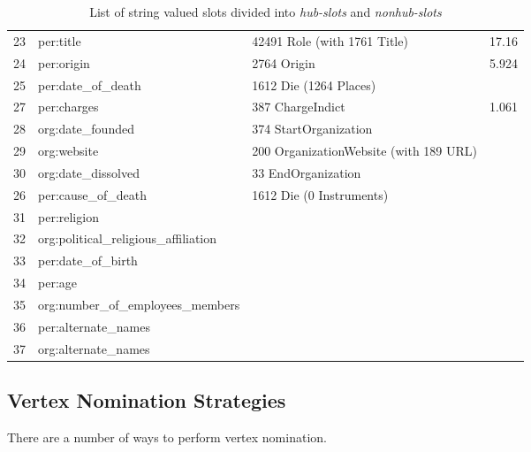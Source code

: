 \documentclass[paper=a4,fontsize=11pt]{scrartcl}
\numberwithin{equation}{section}    %
\numberwithin{figure}{section}      %
\numberwithin{table}{section}       %
\begin{document}
\begin{table}[htbp]
\centering
\begin{adjustwidth}{0}{}
\begin{tabular}{rl l l}
23 & per:title                           & 42491 Role (with 1761 Title)           & 17.16 \\
24 & per:origin                          & 2764 Origin                            & 5.924 \\
25 & per:date_of_death                   & 1612 Die (1264 Places)                         \\
27 & per:charges                         & 387 ChargeIndict                       & 1.061 \\
28 & org:date_founded                    & 374 StartOrganization                          \\
29 & org:website                         & 200 OrganizationWebsite (with 189 URL)         \\
30 & org:date_dissolved                  & 33 EndOrganization                             \\
26 & per:cause_of_death                  & 1612 Die (0 Instruments)                       \\
31 & per:religion                        &                                                \\
32 & org:political_religious_affiliation &                                                \\
33 & per:date_of_birth                   &                                                \\
34 & per:age                                                                              \\
35 & org:number_of_employees_members                                                      \\
36 & per:alternate_names                 &                                                \\
37 & org:alternate_names                                                                  \\
\end{tabular}
\caption{List of string valued slots divided into \textit{hub-slots} and \textit{nonhub-slots}}
\label{tab:string-valued-slots}
\end{adjustwidth}
\end{table}

\subsection{Vertex Nomination Strategies}
\label{sec:vertex-nomination-strategies}
There are a number of ways to perform vertex nomination.
\end{document}
